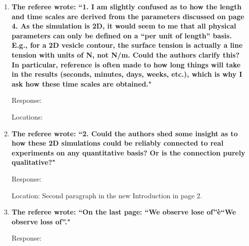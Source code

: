 \documentclass[12pt]{article}
\begin{document}
\begin{enumerate}

\item {\bf The referee wrote: ``1. I am slightly confused as to how the length and time scales are derived from the parameters discussed on page 4. As the simulation is 2D, it would seem to me that all physical parameters can only be defined on a “per unit of length” basis. E.g., for a 2D vesicle contour, the surface tension is actually a line tension with units of N, not N/m. Could the authors clarify this?
In particular, reference is often made to how long things will take in the results (seconds,
minutes, days, weeks, etc.), which is why I ask how these time scales are obtained."}

\noindent
Response: 

\noindent
Locations: 


\item {\bf The referee wrote: ``2. Could the authors shed some insight as to how these 2D simulations could be reliably connected to real experiments on any quantitative basis? Or is the connection purely
qualitative?"}

\noindent
Response: 

\noindent
Location: Second paragraph in the new Introduction in page 2.

\item {\bf The referee wrote: ``On the last page: “We observe lose of”è“We observe loss of”."}

\noindent
Response: \end{enumerate}
\end{document}
